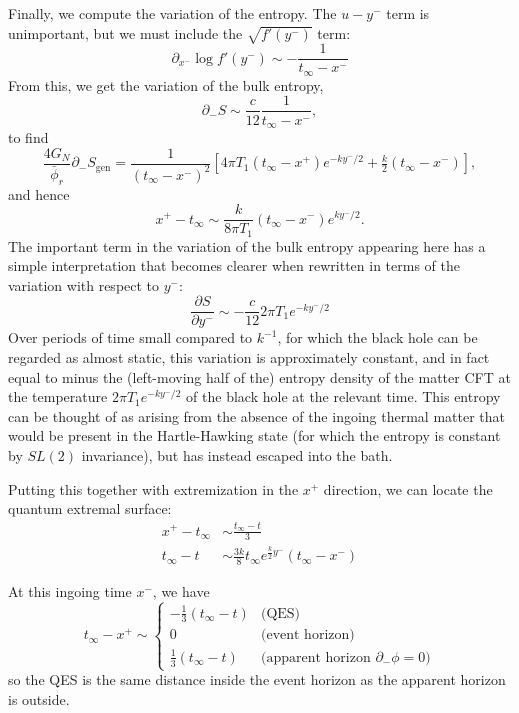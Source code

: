 \documentclass[12pt]{article}
\begin{document}
Finally, we compute the variation of the entropy. The $u-y^-$ term is unimportant, but we must include the $\sqrt{f'(y^-)}$ term:
\begin{equation}
	\partial_{x^-} \log f'(y^-) \sim -\frac{1}{t_\infty -x^-}
\end{equation}
From this, we get the variation of the bulk entropy,
\begin{equation}
	\partial_- S \sim \frac{c}{12}\frac{1}{t_\infty - x^-},
\end{equation}
to find
\begin{equation}
	\frac{4G_N}{\bar{\phi}_r}\partial_- S_\text{gen} = \frac{1}{(t_\infty- x^-)^2} \left[4\pi T_1 (t_\infty -x^+)e^{-ky^-/2} +\tfrac{k}{2}(t_\infty -x^-)\right],
\end{equation}
and hence
\begin{equation}
	x^+ - t_\infty \sim  \frac{k}{8\pi T_1}(t_\infty-x^-)e^{ky^-/2}.
\end{equation}
The important term in the variation of the bulk entropy appearing here has a simple interpretation that becomes clearer when rewritten in terms of the variation with respect to $y^-$:
\begin{equation*}
	\frac{\partial S}{\partial y^-} \sim -\frac{c}{12}2\pi T_1 e^{-k y^-/2}
\end{equation*}
Over periods of time small compared to $k^{-1}$, for which the black hole can be regarded as almost static, this variation is approximately constant, and in fact equal to minus the (left-moving half of the) entropy density of the matter CFT at the temperature $2\pi T_1 e^{-k y^-/2}$ of the black hole at the relevant time. This entropy can be thought of as arising from the absence of the ingoing thermal matter that would be present in the Hartle-Hawking state (for which the entropy is constant by $SL(2)$ invariance), but has instead escaped into the bath.

Putting this together with extremization in the $x^+$ direction, we can locate the quantum extremal surface:
\begin{align}
	x^+-t_\infty &\sim \frac{t_\infty-t}{3} \\
	t_\infty -t &\sim \frac{3k}{8} t_\infty  e^{\frac{k}{2} y^-} (t_\infty -x^-)
\end{align}

At this ingoing time $x^-$, we have
\begin{equation}
	t_\infty -x^+ \sim \begin{cases}
		-\tfrac{1}{3}(t_\infty-t) & \text{(QES)} \\
		0 & \text{(event horizon)} \\
		\tfrac{1}{3}(t_\infty-t) & \text{(apparent horizon $\partial_-\phi=0$)}
	\end{cases}
\end{equation}
so the QES is the same distance inside the event horizon as the apparent horizon is outside.
\end{document}

